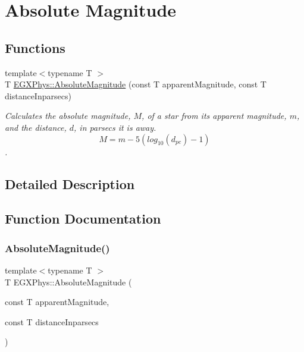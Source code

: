 \hypertarget{group___e_g_x_phys-_astrophysics-_absolute_magnitude}{}\section{Absolute Magnitude}
\label{group___e_g_x_phys-_astrophysics-_absolute_magnitude}
\subsection*{Functions}
\begin{DoxyCompactItemize}
\item 
{\footnotesize template$<$typename T $>$ }\\T \mbox{\hyperlink{group___e_g_x_phys-_astrophysics-_absolute_magnitude_ga2ddb255fa28972334d82f377ce182048}{E\+G\+X\+Phys\+::\+Absolute\+Magnitude}} (const T apparent\+Magnitude, const T distance\+Inparsecs)
\begin{DoxyCompactList}\small\item\em Calculates the absolute magnitude, $M$, of a star from its apparent magnitude, $m$, and the distance, $d$, in parsecs it is away. \[M= m - 5 \left ( log_{10}(d_{pc}) - 1 \right )\]. \end{DoxyCompactList}\end{DoxyCompactItemize}


\subsection{Detailed Description}


\subsection{Function Documentation}
\mbox{\label{group___e_g_x_phys-_astrophysics-_absolute_magnitude_ga2ddb255fa28972334d82f377ce182048}} 
\subsubsection{\texorpdfstring{Absolute\+Magnitude()}{AbsoluteMagnitude()}}
{\footnotesize\ttfamily template$<$typename T $>$ \\
T E\+G\+X\+Phys\+::\+Absolute\+Magnitude (\begin{DoxyParamCaption}\item[{const T}]{apparent\+Magnitude,  }\item[{const T}]{distance\+Inparsecs }\end{DoxyParamCaption})}




